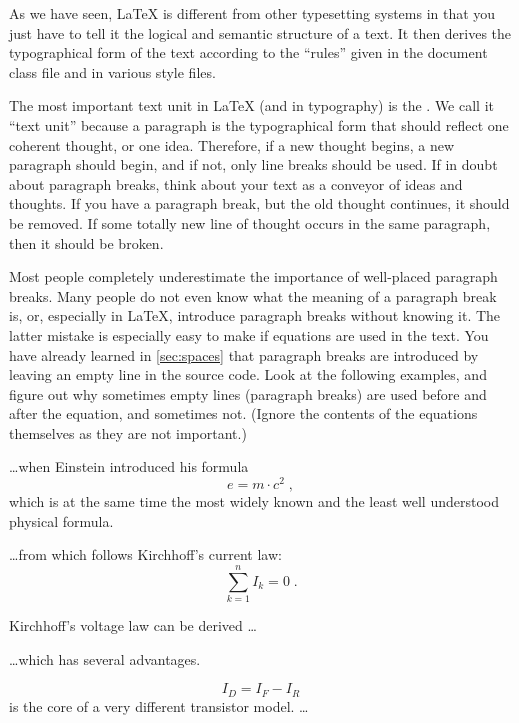 As we have seen, \LaTeX{} is different from other typesetting systems in that
you just have to tell it the logical and semantic structure of a text.  It then
derives the typographical form of the text according to the \enquote{rules}
given in the document class file and in various style files.

The most important text unit in \LaTeX{} (and in typography) is the
.  We call it \enquote{text unit} because a paragraph is the
typographical form that should reflect one coherent thought, or one idea.
Therefore, if a new thought begins, a new paragraph should begin, and if not,
only line breaks should be used.  If in doubt about paragraph breaks, think
about your text as a conveyor of ideas and thoughts.  If you have a paragraph
break, but the old thought continues, it should be removed.  If some totally
new line of thought occurs in the same paragraph, then it should be broken.

Most people completely underestimate the importance of well-placed paragraph
breaks. Many people do not even know what the meaning of a paragraph break is,
or, especially in \LaTeX, introduce paragraph breaks without knowing it.  The
latter mistake is especially easy to make if equations are used in the text.
You have already learned in \autoref{sec:spaces} that paragraph breaks are
introduced by leaving an empty line in the source code. Look at the following
examples, and figure out why sometimes empty lines (paragraph breaks) are used
before and after the equation, and sometimes not. (Ignore the contents of the
equations themselves as they are not important.)

\begin{example}[standalone, paperwidth=5cm, paperheight=4cm]
\ldots when Einstein introduced
his formula
\begin{equation}
  e = m \cdot c^2 \; ,
\end{equation}
which is at the same time the
most widely known and the least
well understood physical formula.
\end{example}
\begin{example}[standalone, paperwidth=5cm, paperheight=4cm]
\ldots from which follows
Kirchhoff's current law:
\begin{equation}
  \sum_{k=1}^{n} I_k = 0 \; .
\end{equation}

Kirchhoff's voltage law can
be derived \ldots
\end{example}
\begin{example}[standalone, paperwidth=5cm, paperheight=4cm]
\ldots which has several
advantages.

\begin{equation}
  I_D = I_F - I_R
\end{equation}
is the core of a very different
transistor model. \ldots
\end{example}

